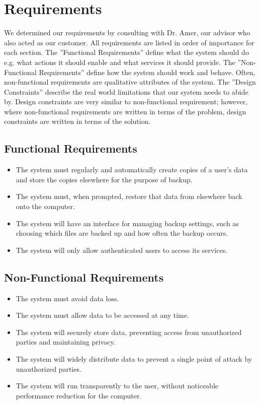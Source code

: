 \section {Requirements}

We determined our requirements by consulting with Dr. Amer, our advisor who also acted as our customer.  All requirements are listed in order of importance for each section.  The ''Functional Requirements'' define what the system should do e.g. what actions it should enable and what services it should provide.  The ''Non-Functional Requirements'' define how the system should work and behave.  Often, non-functional requirements are qualitative attributes of the system.  The ''Design Constraints'' describe the real world limitations that our system needs to abide by.  Design constraints are very similar to non-functional requirement; however, where non-functional requirements are written in terms of the problem, design constraints are written in terms of the solution.

\subsection {Functional Requirements}

\begin{itemize}
		\item The system must regularly and automatically create copies of a user's data and store the copies elsewhere for the purpose of backup.

		\item The system must, when prompted, restore that data from elsewhere back onto the computer.

		\item The system will have an interface for managing backup settings, such as choosing which files are backed up and how often the backup occurs.

		\item The system will only allow authenticated users to access its services.

\end{itemize}

\subsection {Non-Functional Requirements}
	\begin{itemize}
		\item The system must avoid data loss.

		\item The system must allow data to be accessed at any time.

		\item The system will securely store data, preventing access from unauthorized parties and maintaining privacy.

		\item The system will widely distribute data to prevent a single point of attack by unauthorized parties.

		\item The system will run transparently to the user, without noticeable performance reduction for the computer.
	\end{itemize}

